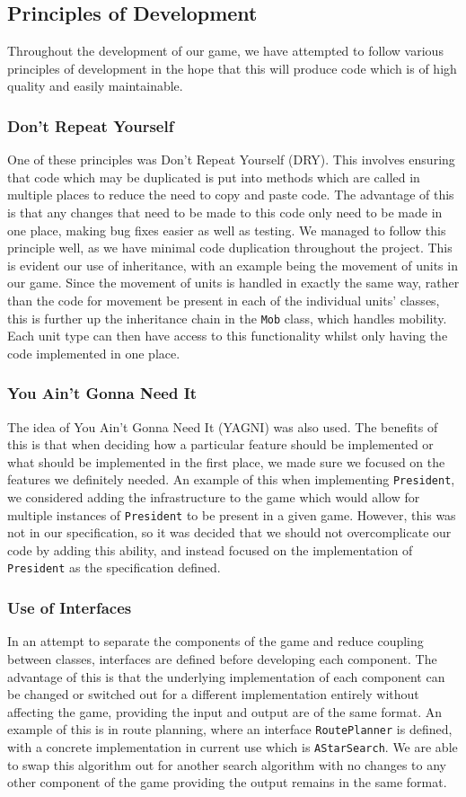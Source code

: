 \documentclass[12pt]{article}
\begin{document}
\subsection{Principles of Development}
Throughout the development of our game, we have attempted to follow various principles of development in the hope that this will produce code which is of high quality and easily maintainable.
\subsubsection{Don't Repeat Yourself}
One of these principles was Don't Repeat Yourself (DRY). This involves ensuring that code which may be duplicated is put into methods which are called in multiple places to reduce the need to copy and paste code. The advantage of this is that any changes that need to be made to this code only need to be made in one place, making bug fixes easier as well as testing. We managed to follow this principle well, as we have minimal code duplication throughout the project. This is evident our use of inheritance, with an example being the movement of units in our game. Since the movement of units is handled in exactly the same way, rather than the code for movement be present in each of the individual units' classes, this is further up the inheritance chain in the \texttt{Mob} class, which handles mobility. Each unit type can then have access to this functionality whilst only having the code implemented in one place.
\subsubsection{You Ain't Gonna Need It}
The idea of You Ain't Gonna Need It (YAGNI) was also used. The benefits of this is that when deciding how a particular feature should be implemented or what should be implemented in the first place, we made sure we focused on the features we definitely needed. An example of this when implementing \texttt{President}, we considered adding the infrastructure to the game which would allow for multiple instances of \texttt{President} to be present in a given game. However, this was not in our specification, so it was decided that we should not overcomplicate our code by adding this ability, and instead focused on the implementation of \texttt{President} as the specification defined.
\subsubsection{Use of Interfaces}
In an attempt to separate the components of the game and reduce coupling between classes, interfaces are defined before developing each component. The advantage of this is that the underlying implementation of each component can be changed or switched out for a different implementation entirely without affecting the game, providing the input and output are of the same format. An example of this is in route planning, where an interface \texttt{RoutePlanner} is defined, with a concrete implementation in current use which is \texttt{AStarSearch}. We are able to swap this algorithm out for another search algorithm with no changes to any other component of the game providing the output remains in the same format.
\end{document}
